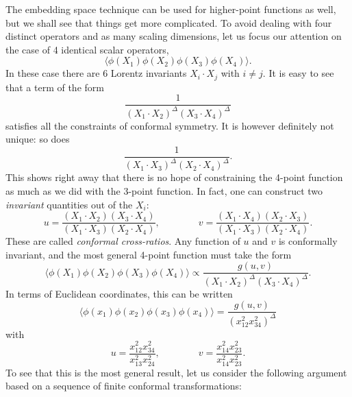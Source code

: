 \documentclass[a4paper,12pt]{article}
\numberwithin{equation}{section}
\begin{document}
The embedding space technique can be used for higher-point functions as well, but we shall see that things get more complicated.
To avoid dealing with four distinct operators and as many scaling dimensions, let us focus our attention on the case of 4 identical scalar operators,
\begin{equation}
	\langle \phi(X_1) \phi(X_2) \phi(X_3) \phi(X_4) \rangle.
\end{equation}
In these case there are 6 Lorentz invariants $X_i \cdot X_j$ with $i \neq j$. It is easy to see that a term of the form
\begin{equation}
	\frac{1}{(X_1 \cdot X_2)^\Delta (X_3 \cdot X_4)^\Delta}
\end{equation}
satisfies all the constraints of conformal symmetry. It is however definitely not unique: so does
\begin{equation}
	\frac{1}{(X_1 \cdot X_3)^\Delta (X_2 \cdot X_4)^\Delta}.
\end{equation}
This shows right away that there is no hope of constraining the 4-point function as much as we did with the 3-point function.
In fact, one can construct two \emph{invariant} quantities out of the $X_i$:
\begin{equation}
	u = \frac{(X_1 \cdot X_2) (X_3 \cdot X_4)}
	{(X_1 \cdot X_3) (X_2 \cdot X_4)},
	\qquad\qquad
	v = \frac{(X_1 \cdot X_4) (X_2 \cdot X_3)}
	{(X_1 \cdot X_3) (X_2 \cdot X_4)}.
\end{equation}
These are called \emph{conformal cross-ratios}. 
Any function of $u$ and $v$ is conformally invariant, and the most general 4-point function must take the form
\begin{equation}
	\langle \phi(X_1) \phi(X_2) \phi(X_3) \phi(X_4) \rangle
	\propto
	\frac{g(u,v)}{(X_1 \cdot X_2)^\Delta (X_3 \cdot X_4)^\Delta}.
\end{equation}
In terms of Euclidean coordinates, this can be written
\begin{equation}
	\langle \phi(x_1) \phi(x_2) \phi(x_3) \phi(x_4) \rangle
	= \frac{g(u,v)}{\left( x_{12}^2 x_{34}^2 \right)^\Delta}
	\label{eq:4pt}
\end{equation}
with
\begin{equation}
	u = \frac{x_{12}^2 x_{34}^2}{x_{13}^2 x_{24}^2},
	\qquad\qquad
	v = \frac{x_{14}^2 x_{23}^2}{x_{14}^2 x_{23}^2}.
	\label{eq:crossratios}
\end{equation}
To see that this is the most general result, let us consider the following argument based on a sequence of finite conformal transformations:
\end{document}
